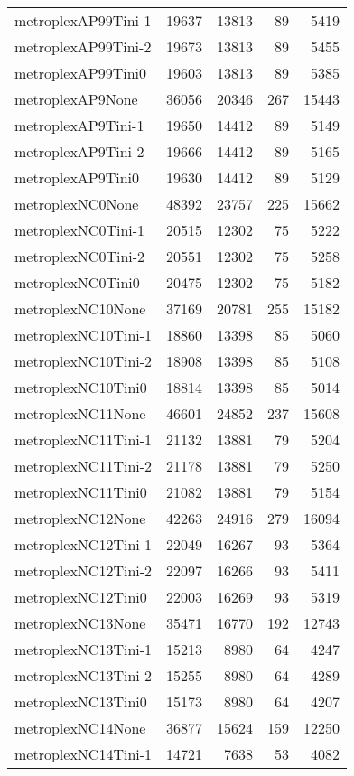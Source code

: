 \begin{longtable}{lrrrr}
metroplexAP99Tini-1 & 19637 & 13813 & 89 & 5419 \\
metroplexAP99Tini-2 & 19673 & 13813 & 89 & 5455 \\
metroplexAP99Tini0 & 19603 & 13813 & 89 & 5385 \\
metroplexAP9None & 36056 & 20346 & 267 & 15443 \\
metroplexAP9Tini-1 & 19650 & 14412 & 89 & 5149 \\
metroplexAP9Tini-2 & 19666 & 14412 & 89 & 5165 \\
metroplexAP9Tini0 & 19630 & 14412 & 89 & 5129 \\
metroplexNC0None & 48392 & 23757 & 225 & 15662 \\
metroplexNC0Tini-1 & 20515 & 12302 & 75 & 5222 \\
metroplexNC0Tini-2 & 20551 & 12302 & 75 & 5258 \\
metroplexNC0Tini0 & 20475 & 12302 & 75 & 5182 \\
metroplexNC10None & 37169 & 20781 & 255 & 15182 \\
metroplexNC10Tini-1 & 18860 & 13398 & 85 & 5060 \\
metroplexNC10Tini-2 & 18908 & 13398 & 85 & 5108 \\
metroplexNC10Tini0 & 18814 & 13398 & 85 & 5014 \\
metroplexNC11None & 46601 & 24852 & 237 & 15608 \\
metroplexNC11Tini-1 & 21132 & 13881 & 79 & 5204 \\
metroplexNC11Tini-2 & 21178 & 13881 & 79 & 5250 \\
metroplexNC11Tini0 & 21082 & 13881 & 79 & 5154 \\
metroplexNC12None & 42263 & 24916 & 279 & 16094 \\
metroplexNC12Tini-1 & 22049 & 16267 & 93 & 5364 \\
metroplexNC12Tini-2 & 22097 & 16266 & 93 & 5411 \\
metroplexNC12Tini0 & 22003 & 16269 & 93 & 5319 \\
metroplexNC13None & 35471 & 16770 & 192 & 12743 \\
metroplexNC13Tini-1 & 15213 & 8980 & 64 & 4247 \\
metroplexNC13Tini-2 & 15255 & 8980 & 64 & 4289 \\
metroplexNC13Tini0 & 15173 & 8980 & 64 & 4207 \\
metroplexNC14None & 36877 & 15624 & 159 & 12250 \\
metroplexNC14Tini-1 & 14721 & 7638 & 53 & 4082 \\

\end{longtable}
